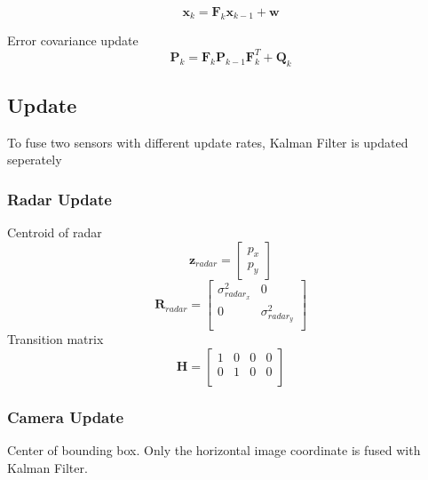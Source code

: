 \begin{equation}\label{equ:predict_eq}
    \mathbf{x}_k=\mathbf{F}_k\mathbf{x}_{k-1}+\mathbf{w}
\end{equation}

Error covariance update
\begin{equation}\label{equ:error_covariance}
    \mathbf{P}_k=\mathbf{F}_k \mathbf{P}_{k-1} \mathbf{F}_k^T+\mathbf{Q}_k
\end{equation}

\subsection{Update}\label{equ:2_update}
To fuse two sensors with different update rates, Kalman Filter is updated seperately
\subsubsection{Radar Update}\label{sec:2-radar_update}  
Centroid of radar
\begin{equation}
    \mathbf{z}_{radar}=
    \begin{bmatrix}
        p_x \\ 
        p_y
    \end{bmatrix}
\end{equation}
\begin{equation}\label{equ:2_radar_R_kf}
    \mathbf{R}_{radar} = 
    \begin{bmatrix}
        \sigma_{radar_x}^2 & 0 \\
        0 & \sigma_{radar_y}^2 \\
      \end{bmatrix}
\end{equation}
Transition matrix
\begin{equation}\label{equ:2_radar_transition_matrix}
    \mathbf{H} = 
    \begin{bmatrix}
        1 & 0 & 0 & 0 \\
        0 & 1 & 0 & 0 \\
      \end{bmatrix}
\end{equation}



\subsubsection{Camera Update}\label{sec:2-camera_update}
Center of bounding box.
Only the horizontal image coordinate is fused with Kalman Filter.

